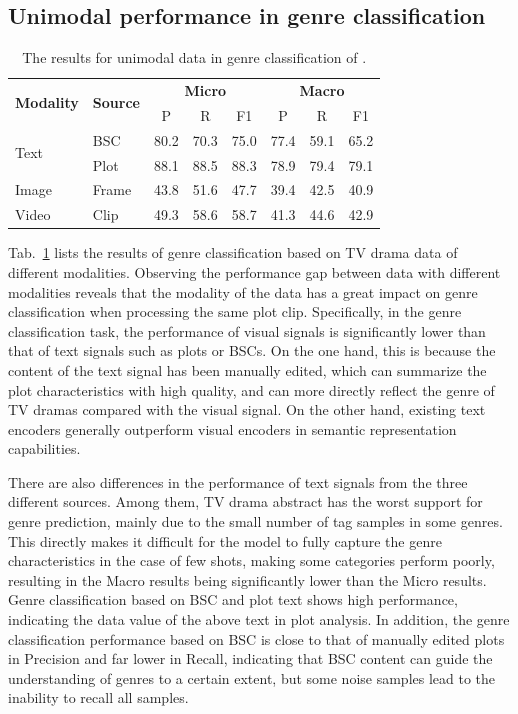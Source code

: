 \subsection{Unimodal performance in genre classification}
\label{sec:app_unimodal_genre_cls}

\begin{table}
\centering
\begin{tabular}{llcccccc}
\toprule
\multirow{2}{*}{\textbf{Modality}} & \multirow{2}{*}{\textbf{Source}} & \multicolumn{3}{c}{\textbf{Micro}} & \multicolumn{3}{c}{\textbf{Macro}} \\
&  &  P & R & F1 & P & R & F1 \\
\midrule
\multirow{2}{*}{Text} & BSC & 80.2 & 70.3 & 75.0 & 77.4 & 59.1 & 65.2 \\
 & Plot & 88.1 & 88.5 & 88.3 & 78.9 & 79.4 & 79.1 \\
\midrule
Image & Frame & 43.8 & 51.6 & 47.7 & 39.4 & 42.5 & 40.9 \\
\midrule
Video & Clip & 49.3 & 58.6 & 58.7 & 41.3 & 44.6 & 42.9 \\
\bottomrule
\end{tabular}
\caption{\label{tab:app_genre_cls}
The results for unimodal data in genre classification of \TVD.
}
\end{table}

Tab.~\ref{tab:app_genre_cls} lists the results of genre classification based on TV drama data of different modalities.
Observing the performance gap between data with different modalities reveals that the modality of the data has a great impact on genre classification when processing the same plot clip.
Specifically, in the genre classification task, the performance of visual signals is significantly lower than that of text signals such as plots or BSCs.
On the one hand, this is because the content of the text signal has been manually edited, which can summarize the plot characteristics with high quality, and can more directly reflect the genre of TV dramas compared with the visual signal.
On the other hand, existing text encoders generally outperform visual encoders in semantic representation capabilities.

There are also differences in the performance of text signals from the three different sources.
Among them, TV drama abstract has the worst support for genre prediction, mainly due to the small number of tag samples in some genres.
This directly makes it difficult for the model to fully capture the genre characteristics in the case of few shots, making some categories perform poorly, resulting in the Macro results being significantly lower than the Micro results.
Genre classification based on BSC and plot text shows high performance, indicating the data value of the above text in plot analysis.
In addition, the genre classification performance based on BSC is close to that of manually edited plots in Precision and far lower in Recall, indicating that BSC content can guide the understanding of genres to a certain extent, but some noise samples lead to the inability to recall all samples.


